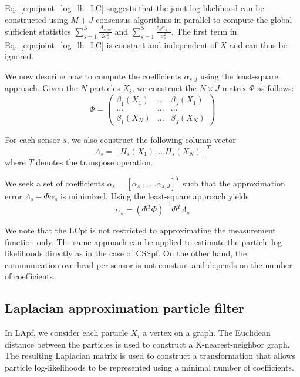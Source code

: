 \documentclass[10pt,letterpaper,final]{article}
\begin{document}
Eq.~\eqref{eqn:joint_log_lh_LC} suggests that the joint log-likelihood can be constructed using $M+J$ consensus algorithms in parallel to compute the global sufficient statistics $\sum_{s=1}^S \frac{A_{s,m}}{2\sigma_s^2}$ and $\sum_{s=1}^S \frac{z_s\alpha_{s,j}}{\sigma_s^2}$. The first term in Eq.~\eqref{eqn:joint_log_lh_LC} is constant and independent of $X$ and can thus be ignored. 

We now describe how to compute the coefficients $\alpha_{s,j}$ using the least-square approach. Given the $N$ particles $X_i$, we construct the $N\times J$ matrix $\Phi$ as follows:
\begin{equation}
\Phi=\left(
\begin{array}{ccc}
\beta_1(X_1) & ... & \beta_J(X_1) \\
... & ... & ... \\
\beta_1(X_N) & ... & \beta_J(X_N)
\end{array}
\right)
\label{eqn:beta_matrix}
\end{equation}

For each sensor $s$, we also construct the following column vector
\begin{equation}
\Lambda_s = [ H_s(X_1), ... H_s(X_N)  ]^T
\label{eqn:lambda_vector}
\end{equation}
where $T$ denotes the transpose operation. 

We seek a set of coefficients $\alpha_s = [\alpha_{s,1},...\alpha_{s,J}]^T$ such that the approximation error $\Lambda_s - \Phi \alpha_s$ is minimized. Using the least-square approach yields
\begin{equation}
\alpha_s = (\Phi^T\Phi)^{-1}\Phi^T\Lambda_s
\end{equation}

We note that the LCpf is not restricted to approximating the measurement function only. The same approach can be applied to estimate the particle log-likelihoods directly as in the case of CSSpf. On the other hand, the communication overhead per sensor is not constant and depends on the number of coefficients.

\subsection{Laplacian approximation particle filter}
In LApf, we consider each particle $X_i$ a vertex on a graph. The Euclidean distance between the particles is used to construct a K-nearest-neighbor graph. The resulting Laplacian matrix is used to construct a transformation that allows particle log-likelihoods to be represented using a minimal number of coefficients. 
\end{document}

